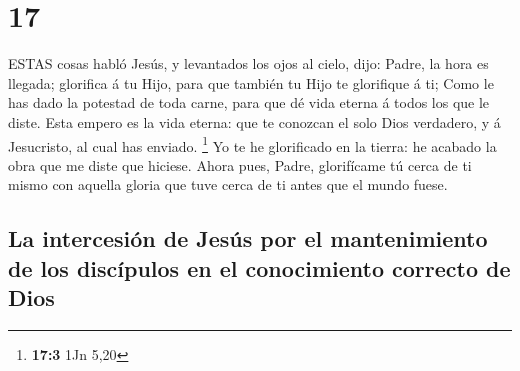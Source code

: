 \hypertarget{section-16}{%
\section{17}\label{section-16}}

 ESTAS cosas habló Jesús, y levantados los ojos al cielo,
dijo: Padre, la hora es llegada; glorifica á tu Hijo, para que también
tu Hijo te glorifique á ti;  Como le has dado la potestad de
toda carne, para que dé vida eterna á todos los que le diste.
 Esta empero es la vida eterna: que te conozcan el solo Dios
verdadero, y á Jesucristo, al cual has enviado. \footnote{\textbf{17:3}
  1Jn 5,20}  Yo te he glorificado en la tierra: he acabado
la obra que me diste que hiciese.  Ahora pues, Padre,
glorifícame tú cerca de ti mismo con aquella gloria que tuve cerca de ti
antes que el mundo fuese.

\hypertarget{la-intercesiuxf3n-de-jesuxfas-por-el-mantenimiento-de-los-discuxedpulos-en-el-conocimiento-correcto-de-dios}{%
\subsection{La intercesión de Jesús por el mantenimiento de los
discípulos en el conocimiento correcto de
Dios}\label{la-intercesiuxf3n-de-jesuxfas-por-el-mantenimiento-de-los-discuxedpulos-en-el-conocimiento-correcto-de-dios}}

